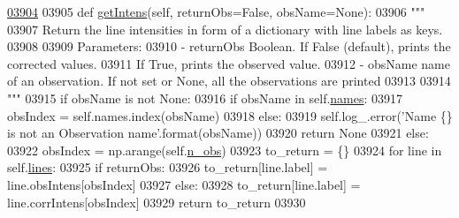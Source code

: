 \begin{DoxyCode}
\hypertarget{classpyneb_1_1core_1_1pynebcore_1_1_observation_l03904}{}\hyperlink{classpyneb_1_1core_1_1pynebcore_1_1_observation_ac380b22660411926b90f935f5123494b}{03904} 
03905     \textcolor{keyword}{def }\hyperlink{classpyneb_1_1core_1_1pynebcore_1_1_observation_ac380b22660411926b90f935f5123494b}{getIntens}(self, returnObs=False, obsName=None):
03906         \textcolor{stringliteral}{"""}
03907 \textcolor{stringliteral}{        Return the line intensities in form of a dictionary with line labels as keys.}
03908 \textcolor{stringliteral}{        }
03909 \textcolor{stringliteral}{        Parameters:}
03910 \textcolor{stringliteral}{            - returnObs  Boolean. If False (default), prints the corrected values. }
03911 \textcolor{stringliteral}{                            If True, prints the observed value. }
03912 \textcolor{stringliteral}{            - obsName    name of an observation. If not set or None, all the observations are printed}
03913 \textcolor{stringliteral}{}
03914 \textcolor{stringliteral}{        """}
03915         \textcolor{keywordflow}{if} obsName \textcolor{keywordflow}{is} \textcolor{keywordflow}{not} \textcolor{keywordtype}{None}:
03916             \textcolor{keywordflow}{if} obsName \textcolor{keywordflow}{in} self.\hyperlink{classpyneb_1_1core_1_1pynebcore_1_1_observation_a3f365d0b1488b2eba300bf71caf23c17}{names}:
03917                 obsIndex = self.names.index(obsName)
03918             \textcolor{keywordflow}{else}:
03919                 self.log\_.error(\textcolor{stringliteral}{'Name \{\} is not an Observation name'}.format(obsName))
03920                 \textcolor{keywordflow}{return} \textcolor{keywordtype}{None}
03921         \textcolor{keywordflow}{else}:
03922             obsIndex = np.arange(self.\hyperlink{classpyneb_1_1core_1_1pynebcore_1_1_observation_a3c9122167ef525b73a62d39d4b5c4239}{n\_obs})
03923         to\_return = \{\}
03924         \textcolor{keywordflow}{for} line \textcolor{keywordflow}{in} self.\hyperlink{classpyneb_1_1core_1_1pynebcore_1_1_observation_a78332043ca9f290590edf6b8a1e5b767}{lines}:
03925             \textcolor{keywordflow}{if} returnObs:
03926                 to\_return[line.label] = line.obsIntens[obsIndex]
03927             \textcolor{keywordflow}{else}:
03928                 to\_return[line.label] = line.corrIntens[obsIndex]
03929         \textcolor{keywordflow}{return} to\_return
03930     
    
\end{DoxyCode}
